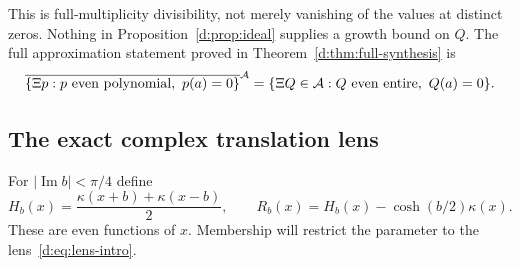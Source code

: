\documentclass[11pt,a4paper]{article}
\numberwithin{equation}{section}
\theoremstyle{definition}\newtheorem{definition}[theorem]{Definition}
\theoremstyle{remark}\newtheorem{remark}[theorem]{Remark}
\begin{document}
This is full-multiplicity divisibility, not merely vanishing of the values at distinct zeros. Nothing in Proposition~\ref{d:prop:ideal} supplies a growth bound on $Q$. The full approximation statement proved in Theorem~\ref{d:thm:full-synthesis} is
\begin{equation}\label{d:eq:ideal-synthesis}
 \overline{\{\Xi p:p\text{ even polynomial},\ p(a)=0\}}^{\mathcal A}
 =\{\Xi Q\in\mathcal A:Q\text{ even entire},\ Q(a)=0\}.
\end{equation}

\subsection{The exact complex translation lens}\label{d:sec:translations}

For $|\operatorname{Im}b|<\pi/4$ define
\begin{equation}\label{d:eq:H-R}
 H_b(x)=\frac{\kappa(x+b)+\kappa(x-b)}2,\qquad
 R_b(x)=H_b(x)-\cosh(b/2)\kappa(x).
\end{equation}
These are even functions of $x$. Membership will restrict the parameter to the lens~\eqref{d:eq:lens-intro}.
\end{document}
